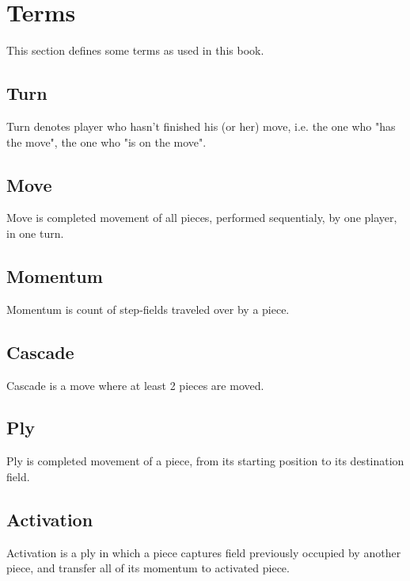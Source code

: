 

\chapter*{Terms}
\label{ch:Terms}

This section defines some terms as used in this book.

\section*{Turn}
\label{sec:Terms/Turn}
Turn denotes player who hasn't finished his (or her) move, i.e. the one who "has the move",
the one who "is on the move".

\section*{Move}
\label{sec:Terms/Move}
Move is completed movement of all pieces, performed sequentialy, by one player, in one turn.

\section*{Momentum}
\label{sec:Terms/Momentum}
Momentum is count of step-fields traveled over by a piece.

\section*{Cascade}
\label{sec:Terms/Cascade}
Cascade is a move where at least 2 pieces are moved.

\section*{Ply}
\label{sec:Terms/Ply}
Ply is completed movement of a piece, from its starting position to its destination field.

\section*{Activation}
\label{sec:Terms/Activation}
Activation is a ply in which a piece captures field previously occupied by another piece,
and transfer all of its momentum to activated piece.

